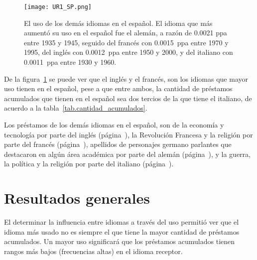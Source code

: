 \label{SP-D}

		
\begin{figure}[h!] %
	\centering
	\texttt{[image: UR1\_SP.png]}
	\caption{El uso de los demás idiomas en el español. El idioma que más aumentó su uso en el español fue el alemán, a razón de 0.0021 ppa entre 1935 y 1945, seguido del francés con 0.0015~ppa entre 1970 y 1995,  del inglés con 0.0012~ppa entre 1950 y 2000, y del italiano con 0.0011~ppa entre 1930 y 1960.}
	\label{fig.UR_SP}
\end{figure}

De la figura~\ref{fig.UR_SP} se puede ver que el inglés y el francés, son los idiomas que mayor uso tienen en el español, pese a que entre ambos, la cantidad de préstamos acumulados que tienen en el español sea dos tercios de la que tiene el italiano, de acuerdo a la tabla~\ref{tab.cantidad_acumulados}.



Los préstamos de los demás idiomas en el español, son de la economía y tecnología por parte del inglés (página~\pageref{EN-D}), la Revolución Francesa y la religión por parte del francés (página~\pageref{FR-D}), apellidos de personajes germano parlantes que destacaron en algún área académica  por parte del alemán (página~\pageref{GE-D}), y la guerra, la política y la religión por parte del italiano (página~\pageref{IT-D}).  



\label{D-SP}




\section{Resultados generales} %


El determinar la influencia entre idiomas a través del uso permitió ver  que el idioma más usado no es siempre el que tiene la mayor cantidad de préstamos acumulados.  Un mayor uso significará que los préstamos acumulados tienen rangos más bajos (frecuencias altas) en el idioma receptor.

